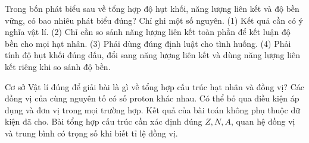 \begin{ex}
Trong bốn phát biểu sau về tổng hợp độ hụt khối, năng lượng liên kết và độ bền vững, có bao nhiêu phát biểu đúng? Chỉ ghi một số nguyên. (1) Kết quả cần có ý nghĩa vật lí. (2) Chỉ cần so sánh năng lượng liên kết toàn phần để kết luận độ bền cho mọi hạt nhân. (3) Phải dùng đúng định luật cho tình huống. (4) Phải tính độ hụt khối đúng dấu, đổi sang năng lượng liên kết và dùng năng lượng liên kết riêng khi so sánh độ bền.
\end{ex}

\begin{ex}
Cơ sở Vật lí đúng để giải bài là gì về tổng hợp cấu trúc hạt nhân và đồng vị?
\choice
{Các đồng vị của cùng nguyên tố có số proton khác nhau.}
{Có thể bỏ qua điều kiện áp dụng và đơn vị trong mọi trường hợp.}
{Kết quả của bài toán không phụ thuộc dữ kiện đã cho.}
{\True Bài tổng hợp cấu trúc cần xác định đúng $Z,N,A$, quan hệ đồng vị và trung bình có trọng số khi biết tỉ lệ đồng vị.}
\end{ex}

